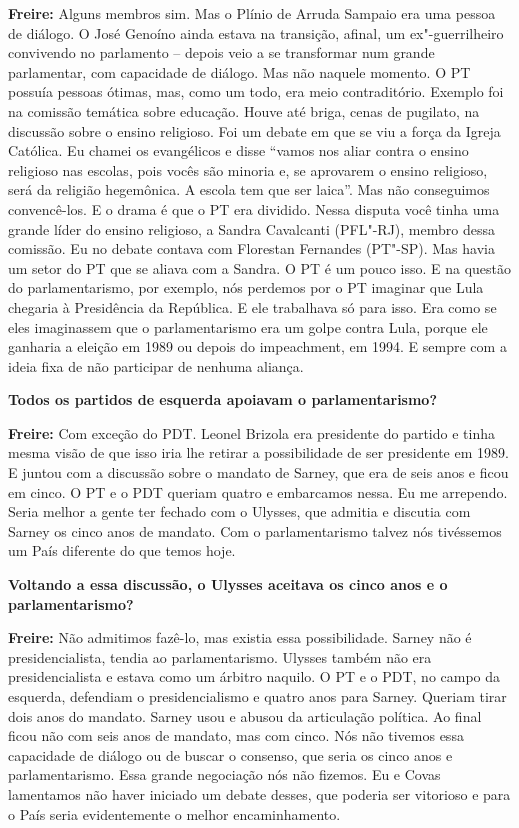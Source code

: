 \textbf{Freire:} Alguns membros sim. Mas o Plínio de Arruda Sampaio era
uma pessoa de diálogo. O José Genoíno ainda estava na transição, afinal,
um ex"-guerrilheiro convivendo no parlamento -- depois veio a se
transformar num grande parlamentar, com capacidade de diálogo. Mas não
naquele momento. O PT possuía pessoas ótimas, mas, como um todo, era
meio contraditório. Exemplo foi na comissão temática sobre educação.
Houve até briga, cenas de pugilato, na discussão sobre o ensino
religioso. Foi um debate em que se viu a força da Igreja Católica. Eu
chamei os evangélicos e disse ``vamos nos aliar contra o ensino
religioso nas escolas, pois vocês são minoria e, se aprovarem o ensino
religioso, será da religião hegemônica. A escola tem que ser laica''.
Mas não conseguimos convencê-los. E o drama é que o PT era dividido.
Nessa disputa você tinha uma grande líder do ensino religioso, a Sandra
Cavalcanti (PFL"-RJ), membro dessa comissão. Eu no debate contava com
Florestan Fernandes (PT"-SP). Mas havia um setor do PT que se aliava com
a Sandra. O PT é um pouco isso. E na questão do parlamentarismo, por
exemplo, nós perdemos por o PT imaginar que Lula chegaria à Presidência
da República. E ele trabalhava só para isso. Era como se eles
imaginassem que o parlamentarismo era um golpe contra Lula, porque ele
ganharia a eleição em 1989 ou depois do impeachment, em 1994. E sempre
com a ideia fixa de não participar de nenhuma aliança.

\textbf{Todos os partidos de esquerda apoiavam o parlamentarismo?}

\textbf{Freire:} Com exceção do PDT. Leonel Brizola era presidente do
partido e tinha mesma visão de que isso iria lhe retirar a possibilidade
de ser presidente em 1989. E juntou com a discussão sobre o mandato de
Sarney, que era de seis anos e ficou em cinco. O PT e o PDT queriam
quatro e embarcamos nessa. Eu me arrependo. Seria melhor a gente ter
fechado com o Ulysses, que admitia e discutia com Sarney os cinco anos
de mandato. Com o parlamentarismo talvez nós tivéssemos um País
diferente do que temos hoje.

\textbf{Voltando a essa discussão, o Ulysses aceitava os cinco anos e o
parlamentarismo?}

\textbf{Freire:} Não admitimos fazê-lo, mas existia essa possibilidade.
Sarney não é presidencialista, tendia ao parlamentarismo. Ulysses também
não era presidencialista e estava como um árbitro naquilo. O PT e o PDT,
no campo da esquerda, defendiam o presidencialismo e quatro anos para
Sarney. Queriam tirar dois anos do mandato. Sarney usou e abusou da
articulação política. Ao final ficou não com seis anos de mandato, mas
com cinco. Nós não tivemos essa capacidade de diálogo ou de buscar o
consenso, que seria os cinco anos e parlamentarismo. Essa grande
negociação nós não fizemos. Eu e Covas lamentamos não haver iniciado um
debate desses, que poderia ser vitorioso e para o País seria
evidentemente o melhor encaminhamento.

